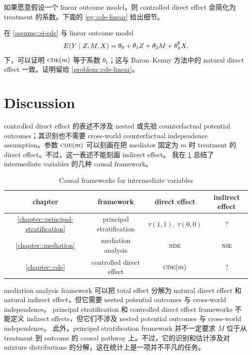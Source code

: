 如果愿意假设一个 linear outcome model，则 controlled direct effect 会简化为 treatment 的系数。下面的 \cref{eg::cde-linear} 给出细节。
\begin{example}
\label{eg::cde-linear}
在 \cref{assume::si-cde} 与 linear outcome model
$$
E(Y\mid Z,M,X) = \theta_0 + \theta_1 Z + \theta_2 M +   \theta_4^{\mkern-1.5mu\mathsf{T}} X,
$$
下，可以证明
$
\textsc{cde}(m) 
$
等于系数 $ \theta_1$；这与 Baron--Kenny 方法中的 natural direct effect 一致。证明留给 \cref{problem::cde-linear}。
\end{example}







\section{Discussion}

controlled direct effect 的表述不涉及 nested 或先验 counterfactual potential outcomes；其识别也不需要 cross-world counterfactual independence assumption。参数 $\textsc{cde}(m)$ 可以刻画在把 mediator 固定为 $m$ 时 treatment 的 direct effect。不过，这一表述不能刻画 indirect effect。
我在 \cref{table::causal-intermediate-frameworks} 总结了 intermediate variables 的几种 causal framework。
 
\begin{table}
\centering 
\caption{Causal frameworks for intermediate variables}\label{table::causal-intermediate-frameworks}
\begin{tabular}{cccc}
\hline 
chapter & framework & direct effect & indirect effect   \\
\hline 
\cref{chapter::principal-stratification} & principal stratification & $\tau(1,1),\ \tau(0,0)$ & ?  \\
\cref{chapter::mediation} & mediation analysis & $\textsc{nde}$ & $\textsc{nie}$  \\
\cref{chapter::cde}& controlled direct effect & $\textsc{cde}(m)$ & ?  \\
\hline 
\end{tabular}
\end{table} 
 
mediation analysis framework 可以把 total effect 分解为 natural direct effect 和 natural indirect effect，但它需要 nested potential outcomes 与 cross-world independence。
principal stratification 和 controlled direct effect frameworks 不能定义 indirect effects，但它们不涉及 nested potential outcomes 与 cross-world independence。
此外，principal stratification framework 并不一定要求 $M$ 位于从 treatment 到 outcome 的 causal pathway 上。不过，它的识别和估计涉及对 mixture distributions 的分解，这在统计上是一项并不平凡的任务。




